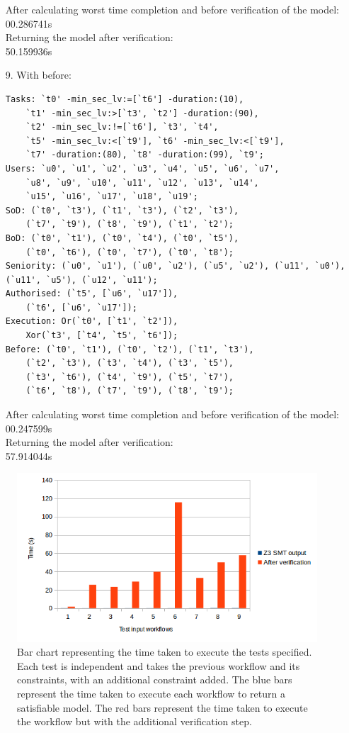 \documentclass[a4paper]{report}
\begin{document}
\begin{enumerate}
After calculating worst time completion and before verification of the model:\\
00.286741s\\
Returning the model after verification: \\
50.159936s\\
\item[9.] With before:
\begin{lstlisting}[frame=single]
Tasks: `t0' -min_sec_lv:=[`t6'] -duration:(10), 
	`t1' -min_sec_lv:>[`t3', `t2'] -duration:(90), 
	`t2' -min_sec_lv:!=[`t6'], `t3', `t4', 
	`t5' -min_sec_lv:<[`t9'], `t6' -min_sec_lv:<[`t9'], 
	`t7' -duration:(80), `t8' -duration:(99), `t9';
Users: `u0', `u1', `u2', `u3', `u4', `u5', `u6', `u7', 
	`u8', `u9', `u10', `u11', `u12', `u13', `u14', 
	`u15', `u16', `u17', `u18', `u19'; 
SoD: (`t0', `t3'), (`t1', `t3'), (`t2', `t3'), 
	(`t7', `t9'), (`t8', `t9'), (`t1', `t2');
BoD: (`t0', `t1'), (`t0', `t4'), (`t0', `t5'), 
	(`t0', `t6'), (`t0', `t7'), (`t0', `t8');
Seniority: (`u0', `u1'), (`u0', `u2'), (`u5', `u2'), (`u11', `u0'), (`u11', `u5'), (`u12', `u11'); 
Authorised: (`t5', [`u6', `u17']), 
	(`t6', [`u6', `u17']);
Execution: Or(`t0', [`t1', `t2']), 
	Xor(`t3', [`t4', `t5', `t6']); 
Before: (`t0', `t1'), (`t0', `t2'), (`t1', `t3'), 
	(`t2', `t3'), (`t3', `t4'), (`t3', `t5'), 
	(`t3', `t6'), (`t4', `t9'), (`t5', `t7'), 
	(`t6', `t8'), (`t7', `t9'), (`t8', `t9');
\end{lstlisting}
After calculating worst time completion and before verification of the model:\\
00.247599s\\
Returning the model after verification: \\
57.914044s\\
\end{enumerate}

\begin{figure}[!h]
\center
\includegraphics[scale=1]{bar_benchmark.png}
\caption{Bar chart representing the time taken to execute the tests specified. Each test is independent  and takes the previous workflow and its constraints, with an additional constraint added. The blue bars represent the time taken to execute each workflow to return a satisfiable model. The red bars represent the time taken to execute the workflow but with the additional verification step.}
\label{fig:both bar chart}
\end{figure}
\end{document}
